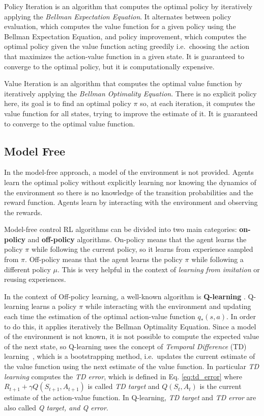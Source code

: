 Policy Iteration is an algorithm that computes the optimal policy by iteratively applying the \textit{Bellman Expectation Equation}.
It alternates between policy evaluation, which computes the value function for a given policy using the Bellman Expectation Equation, and policy improvement, which computes the optimal policy given the value function acting greedily i.e.\ choosing the action that maximizes the action-value function in a given state.
It is guaranteed to converge to the optimal policy, but it is computationally expensive.

Value Iteration is an algorithm that computes the optimal value function by iteratively applying the \textit{Bellman Optimality Equation}.
There is no explicit policy here, its goal is to find an optimal policy $\pi$ so, at each iteration, it computes the value function for all states, trying to improve the estimate of it.
It is guaranteed to converge to the optimal value function.


\subsection{Model Free}
\label{subsec:model_free_rl}
In the model-free approach, a model of the environment is not provided.
Agents learn the optimal policy without explicitly learning nor knowing the dynamics of the environment so there is no knowledge of the transition probabilities and the reward function.
Agents learn by interacting with the environment and observing the rewards.


Model-free control RL algorithms can be divided into two main categories: \textbf{on-policy} and \textbf{off-policy} algorithms.
On-policy means that the agent learns the policy $\pi$ while following the current policy, so it learns from experience sampled from $\pi$.
Off-policy means that the agent learns the policy $\pi$ while following a different policy $\mu$.
This is very helpful in the context of \textit{learning from imitation} or reusing experiences.

In the context of Off-policy learning, a well-known algorithm is \textbf{Q-learning} \citep{watkins1992q}.
Q-learning learns a policy $\pi$ while interacting with the environment and updating each time the estimation of the optimal action-value function $q_*(s,a)$.
In order to do this, it applies iteratively the Bellman Optimality Equation.
Since a model of the environment is not known, it is not possible to compute the expected value of the next state, so Q-learning uses the concept of \textit{Temporal Difference} (TD) learning~\citep{sutton1988learning}, which is a bootstrapping method, i.e.\ updates the current estimate of the value function using the next estimate of the value function.
In particular \textit{TD learning} computes the \textit{TD error}, which is defined in Eq. \ref{eq:td_error} where  $R_{t+1} + \gamma Q(S_{t+1}, A_{t+1})$ is called \textit{TD target} and $Q(S_t, A_t)$ is the current estimate of the action-value function.
In Q-learning, \textit{TD target} and \textit{TD error} are also called \textit{Q target, and Q error}.

